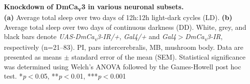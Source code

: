 \label{fig:6}
\textbf{Knockdown of DmCa\textsubscript{v}3 in various neuronal subsets.}
\\
\textbf {(a)} Average total sleep over two days of 12h:12h light-dark cycles (LD).
\textbf {(b)} Average total sleep over two days of continuous darkness (DD).
White, grey, and black bars denote \emph{UAS-DmCa\textsubscript{v}3-IR/+}, \emph{Gal4/+} and \emph{Gal4$>$DmCa\textsubscript{v}3-IR}, respectively (n=21--83).
PI, pars intercerebralis, MB, mushroom body. 
Data are presented as means $\pm$ standard error of the mean (SEM).
Statistical significance was determined using Welch's ANOVA followed by the Games-Howell post hoc test.
*\emph{p}$<$0.05, **\emph{p}$<$0.01, ***\emph{p}$<$0.001
